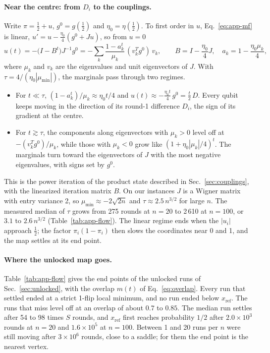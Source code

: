 \paragraph{Near the centre: from $D_i$ to the couplings.} Write $\pi=\frac12+u$, $g^0=g(\frac12)$ and $\eta_0=\eta(\frac12)$. To first order in $u$, Eq.~\eqref{eq:app-mf} is linear, $u'=u-\frac{\eta_0}{4}(g^0+Ju)$, so from $u=0$
\begin{equation}
u(t)=-\bigl(I-B^t\bigr)J^{-1}g^0=-\sum_k\frac{1-a_k^t}{\mu_k}\,(v_k^Tg^0)\,v_k,\qquad B=I-\frac{\eta_0}{4}J,\quad a_k=1-\frac{\eta_0\mu_k}{4},
\label{eq:app-linear}
\end{equation}
where $\mu_k$ and $v_k$ are the eigenvalues and unit eigenvectors of $J$. With $\tau=4/(\eta_0|\mu_{\min}|)$, the marginals pass through two regimes.
\begin{itemize}
\item For $t\ll\tau$, $(1-a_k^t)/\mu_k\approx\eta_0t/4$ and $u(t)\approx-\frac{\eta_0t}{4}\,g^0=\frac t2\,D$. Every qubit keeps moving in the direction of its round-1 difference $D_i$, the sign of its gradient at the centre.
\item For $t\gtrsim\tau$, the components along eigenvectors with $\mu_k>0$ level off at $-(v_k^Tg^0)/\mu_k$, while those with $\mu_k<0$ grow like $(1+\eta_0|\mu_k|/4)^t$. The marginals turn toward the eigenvectors of $J$ with the most negative eigenvalues, with signs set by $g^0$.
\end{itemize}
This is the power iteration of the product state described in Sec.~\ref{sec:couplings}, with the linearized iteration matrix $B$. On our instances $J$ is a Wigner matrix with entry variance 2, so $\mu_{\min}\approx-2\sqrt{2n}$ and $\tau\approx2.5\,n^{3/2}$ for large $n$. The measured median of $\tau$ grows from 275 rounds at $n=20$ to 2\,610 at $n=100$, or $3.1$ to $2.6\,n^{3/2}$ (Table~\ref{tab:app-flow}). The linear regime ends when the $|u_i|$ approach $\frac12$; the factor $\pi_i(1-\pi_i)$ then slows the coordinates near 0 and 1, and the map settles at its end point.

\paragraph{Where the unlocked map goes.} Table~\ref{tab:app-flow} gives the end points of the unlocked runs of Sec.~\ref{sec:unlocked}, with the overlap $m(t)$ of Eq.~\eqref{eq:overlap}. Every run that settled ended at a strict 1-flip local minimum, and no run ended below $x_{\mathrm{ref}}$. The runs that miss level off at an overlap of about $0.7$ to $0.85$. The median run settles after 54 to 98 times $S$ rounds, and $x_{\mathrm{ref}}$ first reaches probability $1/2$ after $2.0\times10^3$ rounds at $n=20$ and $1.6\times10^5$ at $n=100$. Between 1 and 20 runs per $n$ were still moving after $3\times10^6$ rounds, close to a saddle; for them the end point is the nearest vertex.

